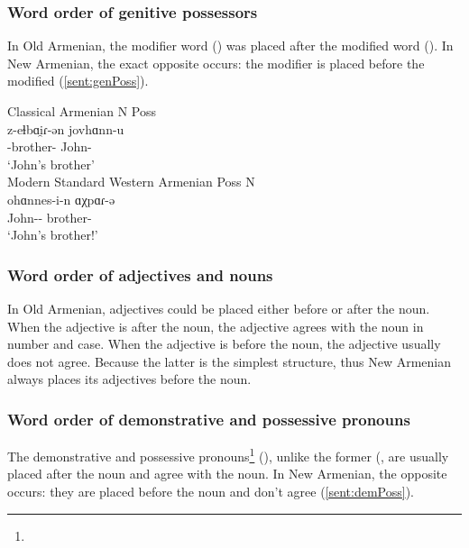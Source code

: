 \subsubsection{Word order of genitive possessors}

In Old Armenian, the modifier word () was placed after the modified word (). In New Armenian, the exact opposite occurs: the modifier is placed before the modified (\ref{sent:genPoss}). 

\begin{exe}
	
	\ex \label{sent:genPoss}   \begin{xlist}
		\ex Classical Armenian \glll N Poss \\
		z-eɬbɑi̯ɾ-ən jovhɑnn-u \\
		{\acc}-brother-{\dist} John-{\gen} \\
		\trans `John's brother'\\
		\ex Modern Standard Western Armenian \glll Poss N \\
		ohɑnnes-i-n ɑχpɑɾ-ə \\ 
		John-{\gen}-{} brother-{} \\
		\trans `John's brother!'\\
	\end{xlist}
\end{exe}

\subsubsection{Word order of adjectives and nouns}

In Old Armenian, adjectives could be placed either before or after the noun. When the adjective is after the noun, the adjective agrees with the noun in number and case. When the adjective is before the noun, the adjective usually does not agree. Because the latter is the simplest structure, thus New Armenian always places its adjectives before the noun. 

\subsubsection{Word order of demonstrative and possessive pronouns}

The demonstrative and possessive pronouns\footnote{} (), unlike the former (, are usually placed after the noun and agree with the noun. In New Armenian, the opposite occurs: they are placed before the noun and don't agree (\ref{sent:demPoss}). 


